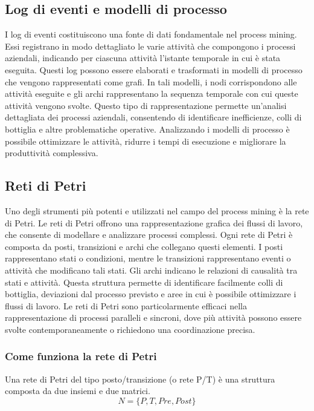 \documentclass{article}
\begin{document}
\subsection{Log di eventi e modelli di processo}

I log di eventi costituiscono una fonte di dati fondamentale nel process mining. Essi registrano in modo dettagliato le varie attività che compongono i processi aziendali, indicando per ciascuna attività l'istante temporale in cui è stata eseguita. Questi log possono essere elaborati e trasformati in modelli di processo che vengono rappresentati come grafi. In tali modelli, i nodi corrispondono alle attività eseguite e gli archi rappresentano la sequenza temporale con cui queste attività vengono svolte. Questo tipo di rappresentazione permette un'analisi dettagliata dei processi aziendali, consentendo di identificare inefficienze, colli di bottiglia e altre problematiche operative. Analizzando i modelli di processo è possibile ottimizzare le attività, ridurre i tempi di esecuzione e migliorare la produttività complessiva.

\subsection{Reti di Petri}

Uno degli strumenti più potenti e utilizzati nel campo del process mining è la rete di Petri. Le reti di Petri offrono una rappresentazione grafica dei flussi di lavoro, che consente di modellare e analizzare processi complessi. Ogni rete di Petri è composta da posti, transizioni e archi che collegano questi elementi. I posti rappresentano stati o condizioni, mentre le transizioni rappresentano eventi o attività che modificano tali stati. Gli archi indicano le relazioni di causalità tra stati e attività. Questa struttura permette di identificare facilmente colli di bottiglia, deviazioni dal processo previsto e aree in cui è possibile ottimizzare i flussi di lavoro. Le reti di Petri sono particolarmente efficaci nella rappresentazione di processi paralleli e sincroni, dove più attività possono essere svolte contemporaneamente o richiedono una coordinazione precisa.

\subsubsection{Come funziona la rete di Petri}

Una rete di Petri del tipo posto/transizione (o rete P/T) è una struttura composta da due insiemi e due matrici.
\[
N = \{ P,T,Pre, Post \}
\]
\end{document}
